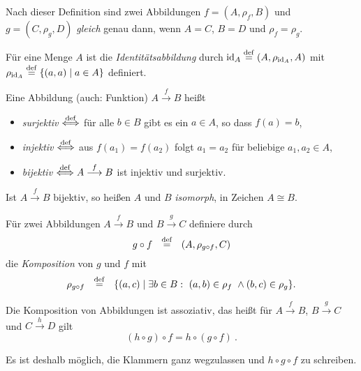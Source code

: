 Nach dieser Definition sind
zwei Abbildungen $f=(A,\rho_f,B)$ und $g=(C,\rho_g,D)$ \emph{gleich} genau
dann, wenn $A=C$, $B=D$ und $\rho_f=\rho_g$.

\begin{definition} 
 Für eine Menge $A$ ist die \emph{Identitätsabbildung} 
   durch $\textrm{id}_A \stackrel{\rm def}{=} (A,\rho_{\textrm{id}_A},A)$ mit $\rho_{\textrm{id}_A}
   \stackrel{\rm def}{=} \{(a,a)\mid a \in A\}$ definiert.
\end{definition}

\begin{definition}
Eine Abbildung (auch: Funktion) $A \stackrel{f}{\longrightarrow} B$ heißt
    \begin{itemize}
    \item \emph{surjektiv} $\stackrel{\rm def}{\Longleftrightarrow}$ für alle $b\in B$ gibt es ein $a\in A$, so dass $f(a)=b$,
    \item \emph{injektiv} $\stackrel{\rm def}{\Longleftrightarrow}$ aus $f(a_1) = f(a_2)$ folgt
          $a_1 = a_2$ für beliebige $a_1,a_2 \in A$,
    \item \emph{bijektiv} $\stackrel{\rm def}{\Longleftrightarrow} A \stackrel{f}{\longrightarrow} B$
      ist injektiv und surjektiv.
    \end{itemize}
    Ist $A \stackrel{f}{\longrightarrow} B$ bijektiv, so heißen $A$ und $B$
    \emph{isomorph}, in Zeichen $A \cong B$.

\end{definition}

\begin{definition}
    Für zwei Abbildungen $A \stackrel{f}{\longrightarrow} B$ und
    $B \stackrel{g}{\longrightarrow} C$ definiere durch
    \[ g \circ f\ \ \deq\ \ (A,\rho_{g \circ f},C)\]
     die \emph{Komposition}
    von $g$ und $f$  mit
    \[ \rho_{g \circ f}\ \ \stackrel{\rm def}{=}\ \ \{(a,c)\mid \exists b \in B:\
         (a,b) \in \rho_f\ \wedge (b,c) \in \rho_g\} .\]
\end{definition}

\begin{lemma} Die Komposition von Abbildungen ist assoziativ, das heißt
   für $A \stackrel{f}{\longrightarrow} B$, $B \stackrel{g}{\longrightarrow} C$
   und $C \stackrel{h}{\longrightarrow} D$ gilt
   \[ (h \circ g) \circ f = h \circ (g \circ f)\ .\]
\end{lemma}
Es ist deshalb möglich, die Klammern ganz wegzulassen und $h \circ g \circ f$
zu  schreiben.

